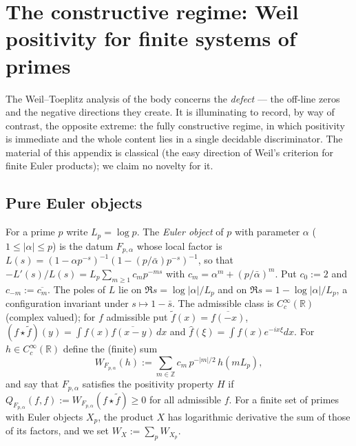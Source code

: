 \documentclass[11pt,reqno]{amsart}
\theoremstyle{definition}
\newcommand{\R}{\mathbb{R}}
\newcommand{\Z}{\mathbb{Z}}
\begin{document}
\appendix
\section{The constructive regime: Weil positivity for finite systems of primes}
\label{app:constructive}

The Weil--Toeplitz analysis of the body concerns the \emph{defect} --- the off-line
zeros and the negative directions they create. It is illuminating to record, by way
of contrast, the opposite extreme: the fully constructive regime, in which positivity
is immediate and the whole content lies in a single decidable discriminator. The
material of this appendix is classical (the easy direction of Weil's criterion
\cite{Weil1952} for finite Euler products); we claim no novelty for it.

\subsection{Pure Euler objects}
For a prime $p$ write $L_p=\log p$. The \emph{Euler object} of $p$ with parameter
$\alpha$ ($1\le|\alpha|\le p$) is the datum $F_{p,\alpha}$ whose local factor is
$L(s)=(1-\alpha p^{-s})^{-1}(1-(p/\bar\alpha)p^{-s})^{-1}$, so that
$-L'(s)/L(s)=L_p\sum_{m\ge1}c_mp^{-ms}$ with $c_m=\alpha^m+(p/\bar\alpha)^m$.
Put $c_0:=2$ and $c_{-m}:=\overline{c_m}$. The poles of $L$ lie on
$\Re s=\log|\alpha|/L_p$ and on $\Re s=1-\log|\alpha|/L_p$, a configuration
invariant under $s\mapsto1-\bar s$. The admissible class is $C_c^\infty(\R)$
(complex valued); for $f$ admissible put $\tilde f(x)=\overline{f(-x)}$,
$(f\star\tilde f)(y)=\int f(x)\overline{f(x-y)}\,dx$ and
$\widehat f(\xi)=\int f(x)e^{-ix\xi}dx$. For $h\in C_c^\infty(\R)$ define the
(finite) sum
\[
W_{F_{p,\alpha}}(h):=\sum_{m\in\Z}c_m\,p^{-|m|/2}\,h(mL_p),
\]
and say that $F_{p,\alpha}$ satisfies the positivity property $H$ if
$Q_{F_{p,\alpha}}(f,f):=W_{F_{p,\alpha}}(f\star\tilde f)\ge0$ for all admissible
$f$. For a finite set of primes with Euler objects $X_p$, the product $X$ has
logarithmic derivative the sum of those of its factors, and we set
$W_X:=\sum_pW_{X_p}$.
\end{document}
